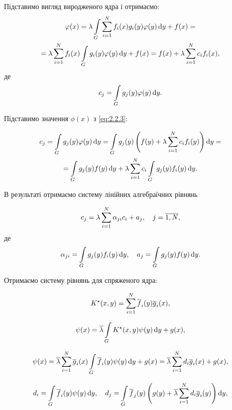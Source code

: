 Підставимо вигляд виродженого ядра і отримаємо:
\begin{multline}
	\varphi(x) = \lambda \displaystyle\int\limits_G \displaystyle\sum\limits_{i = 1}^N f_i(x) g_i(y) \varphi(y) \mathop{}\!\mathrm{d} y + f(x) = \\
	= \lambda \displaystyle\sum\limits_{i = 1}^N f_i(x) \displaystyle\int\limits_G g_i(y) \varphi(y) \mathop{}\!\mathrm{d} y + f(x) = f(x) + \lambda \displaystyle\sum\limits_{i = 1}^N c_i f_i(x),
\end{multline}
де 
\begin{equation}
	c_j = \displaystyle\int\limits_G g_j(y) \varphi(y) \mathop{}\!\mathrm{d} y.
\end{equation}

Підставимо значення $\phi(x)$ з \eqref{eq:2.2.3}:

\begin{multline}
	c_j = \displaystyle\int\limits_G g_j(y) \varphi(y) \mathop{}\!\mathrm{d} y = \displaystyle\int\limits_G g_j(y) \left( f(y) + \lambda \displaystyle\sum\limits_{i = 1}^N c_i f_i(y) \right) \mathop{}\!\mathrm{d} y = \\
	= \displaystyle\int\limits_G g_j(y) f(y) \mathop{}\!\mathrm{d} y + \lambda \displaystyle\sum\limits_{i = 1}^N c_i \displaystyle\int\limits_G g_j(y) f_i(y) \mathop{}\!\mathrm{d} y.
\end{multline}

В результаті отримаємо систему лінійних алгебраїчних рівнянь

\begin{equation}
	c_j = \lambda \displaystyle\sum\limits_{i = 1}^N \alpha_{j i} c_i + a_j, \quad j = \overline{1, N},
\end{equation}
де 
\begin{equation}
	\alpha_{ji} = \displaystyle\int\limits_G g_j(y) f_i(y) \mathop{}\!\mathrm{d} y, \quad a_j = \displaystyle\int\limits_G g_j(y) f(y) \mathop{}\!\mathrm{d} y.
\end{equation}

Отримаємо систему рівнянь для спряженого ядра:

\begin{equation}
	K^\star (x, y) = \displaystyle\sum\limits_{i = 1}^N \overline f_i(y) \overline g_i(x),
\end{equation}

\begin{equation}
	\psi(x) = \overline \lambda \displaystyle\int\limits_G K^\star (x, y) \psi(y) \mathop{}\!\mathrm{d} y + g(x),
\end{equation}

\begin{equation}
	\psi(x) = \overline \lambda \displaystyle\sum\limits_{i = 1}^N \overline g_i(x) \displaystyle\int\limits_G \overline f_i(y) \psi(y) \mathop{}\!\mathrm{d} y + g(x) = \overline \lambda \displaystyle\sum\limits_{i = 1}^N d_i \overline g_i(x) + g(x),
\end{equation}

\begin{equation}
	d_i = \displaystyle\int\limits_G \overline f_i(y) \psi(y) \mathop{}\!\mathrm{d} y, \quad d_j = \displaystyle\int\limits_G \overline f_j(y) \left( g(y) + \overline \lambda \displaystyle\sum\limits_{i = 1}^N d_i \overline g_i(y) \right) \mathop{}\!\mathrm{d} y,
\end{equation}

